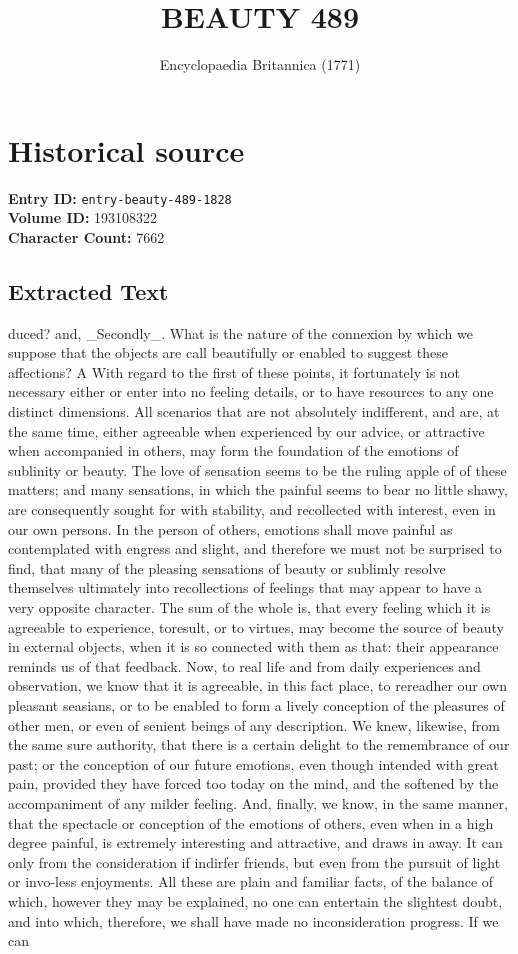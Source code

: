 \documentclass{article}
\title{BEAUTY 489}
\date{Encyclopaedia Britannica (1771)}
\begin{document}
\maketitle

\section*{Historical source}
\textbf{Entry ID:} \texttt{entry-beauty-489-1828} \\
\textbf{Volume ID:} 193108322 \\
\textbf{Character Count:} 7662

\subsection*{Extracted Text}
duced? and, \_Secondly\_. What is the nature of the connexion by which we suppose that the objects are call beautifully or enabled to suggest these affections? A With regard to the first of these points, it fortunately is not necessary either or enter into no feeling details, or to have resources to any one distinct dimensions. All scenarios that are not absolutely indifferent, and are, at the same time, either agreeable when experienced by our advice, or attractive when accompanied in others, may form the foundation of the emotions of sublinity or beauty. The love of sensation seems to be the ruling apple of of these matters; and many sensations, in which the painful seems to bear no little shawy, are consequently sought for with stability, and recollected with interest, even in our own persons. In the person of others, emotions shall move painful as contemplated with engress and slight, and therefore we must not be surprised to find, that many of the pleasing sensations of beauty or sublimly resolve themselves ultimately into recollections of feelings that may appear to have a very opposite character. The sum of the whole is, that every feeling which it is agreeable to experience, toresult, or to virtues, may become the source of beauty in external objects, when it is so connected with them as that: their appearance reminds us of that feedback. Now, to real life and from daily experiences and observation, we know that it is agreeable, in this fact place, to rereadher our own pleasant seasians, or to be enabled to form a lively conception of the pleasures of other men, or even of senient beings of any description. We knew, likewise, from the same sure authority, that there is a certain delight to the remembrance of our past; or the conception of our future emotions, even though intended with great pain, provided they have forced too today on the mind, and the softened by the accompaniment of any milder feeling. And, finally, we know, in the same manner, that the spectacle or conception of the emotions of others, even when in a high degree painful, is extremely interesting and attractive, and draws in away. It can only from the consideration if indirfer friends, but even from the pursuit of light or invo-less enjoyments. All these are plain and familiar facts, of the balance of which, however they may be explained, no one can entertain the slightest doubt, and into which, therefore, we shall have made no inconsideration progress. If we can 
\end{document}
